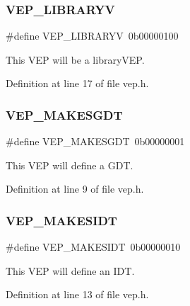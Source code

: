 \subsubsection{\texorpdfstring{V\+E\+P\+\_\+\+L\+I\+B\+R\+A\+R\+YV}{VEP\_LIBRARYV}}
{\footnotesize\ttfamily \#define V\+E\+P\+\_\+\+L\+I\+B\+R\+A\+R\+YV~0b00000100}



This V\+EP will be a library\+V\+EP. 



Definition at line 17 of file vep.\+h.

\mbox{\label{a00089_a07092a70a7d784c7a3c3d605cea807af_a07092a70a7d784c7a3c3d605cea807af}} 
\subsubsection{\texorpdfstring{V\+E\+P\+\_\+\+M\+A\+K\+E\+S\+G\+DT}{VEP\_MAKESGDT}}
{\footnotesize\ttfamily \#define V\+E\+P\+\_\+\+M\+A\+K\+E\+S\+G\+DT~0b00000001}



This V\+EP will define a G\+DT. 



Definition at line 9 of file vep.\+h.

\mbox{\label{a00089_a9167064be23f5789ed435d3a9edbb475_a9167064be23f5789ed435d3a9edbb475}} 
\subsubsection{\texorpdfstring{V\+E\+P\+\_\+\+M\+A\+K\+E\+S\+I\+DT}{VEP\_MAKESIDT}}
{\footnotesize\ttfamily \#define V\+E\+P\+\_\+\+M\+A\+K\+E\+S\+I\+DT~0b00000010}



This V\+EP will define an I\+DT. 



Definition at line 13 of file vep.\+h.



